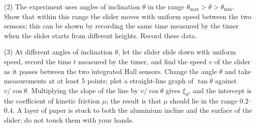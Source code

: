 (2) The experiment uses angles of inclination $\theta$ in the range $\theta_{\max}>\theta>\theta_{\min}$. Show that within this range the slider moves with uniform speed between the two sensors; this can be shown by recording the same time measured by the timer when the slider starts from different heights. Record these data.

(3) At different angles of inclination $\theta$, let the slider slide down with uniform speed, record the time $t$ measured by the timer, and find the speed $v$ of the slider as it passes between the two integrated Hall sensors. Change the angle $\theta$ and take measurements at at least 5 points; plot a straight-line graph of $\tan\theta$ against $v/\cos\theta$. Multiplying the slope of the line by $v/\cos\theta$ gives $\xi_d$, and the intercept is the coefficient of kinetic friction $\mu$; the result is that $\mu$ should lie in the range $0.2$--$0.4$. A layer of paper is stuck to both the aluminium incline and the surface of the slider; do not touch them with your hands.
